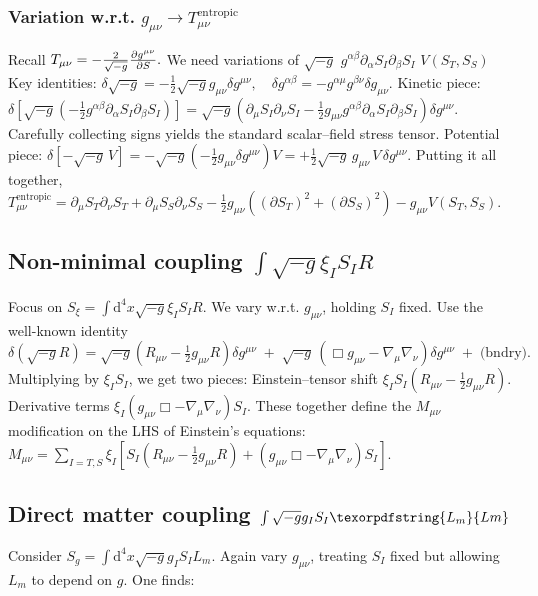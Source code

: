 \documentclass[11pt,a4paper]{article} %
\newcommand{\ST}{S_T}
\newcommand{\SSp}{S_S} %
\newcommand{\Lm}{L_m}
\newcommand{\Tmu}{T} %
\newcommand{\Mmu}{M} %
\newcommand{\Tmnentropic}{T^{\text{entropic}}_{\mu\nu}}
\begin{document}
\subsubsection{Variation w.r.t. $g_{\mu\nu}\to\Tmnentropic$}
\label{app:1.2}
Recall
$\Tmu_{\mu\nu}=-\frac{2}{\sqrt{-g}}\pdv{g^{\mu\nu}}{S}.$
We need variations of
$\sqrt{-g}$
$g^{\alpha\beta}\partial_\alpha S_I\partial_\beta S_I$
$V(\ST,\SSp)$
Key identities:
$\delta\sqrt{-g}=-\frac{1}{2}\sqrt{-g}g_{\mu\nu}\delta g^{\mu\nu},\quad \delta g^{\alpha\beta}=-g^{\alpha\mu}g^{\beta\nu}\delta g_{\mu\nu}.$
Kinetic piece:
$\delta\left[\sqrt{-g}\left(-\frac{1}{2}g^{\alpha\beta}\partial_\alpha S_I\partial_\beta S_I\right)\right]=\sqrt{-g}\left(\partial_\mu S_I\partial_\nu S_I-\frac{1}{2}g_{\mu\nu}g^{\alpha\beta}\partial_\alpha S_I\partial_\beta S_I\right)\delta g^{\mu\nu}.$
Carefully collecting signs yields the standard scalar–field stress tensor.
Potential piece:
$\delta[-\sqrt{-g}\,V] = -\sqrt{-g}\left(-\frac{1}{2}g_{\mu\nu}\delta g^{\mu\nu}\right)V = +\frac{1}{2}\sqrt{-g}\,g_{\mu\nu}\,V\,\delta g^{\mu\nu}.$
Putting it all together,
$\Tmnentropic=\partial_\mu\ST\partial_\nu\ST+\partial_\mu\SSp\partial_\nu\SSp-\frac{1}{2}g_{\mu\nu}\left((\partial\ST)^2+(\partial\SSp)^2\right)-g_{\mu\nu}V(\ST,\SSp).$

\subsection{Non-minimal coupling $\int\sqrt{-g}\xi_I S_I R$}
\label{app:2.2}
Focus on
$S_\xi=\int\text{d}^4x\sqrt{-g}\xi_I S_I R.$
We vary w.r.t. $g_{\mu\nu}$, holding $S_I$ fixed. Use the well-known identity
$\delta(\sqrt{-g}R) =\sqrt{-g}\left(R_{\mu\nu}-\frac{1}{2}g_{\mu\nu}R\right)\delta g^{\mu\nu} \;+\;\sqrt{-g}\,\left(\Box g_{\mu\nu}-\nabla_\mu\nabla_\nu\right)\delta g^{\mu\nu} \;+\;\text{(bndry)}.$
Multiplying by $\xi_I S_I$, we get two pieces:
Einstein–tensor shift
$\xi_I S_I(R_{\mu\nu}-\frac{1}{2}g_{\mu\nu}R).$
Derivative terms
$\xi_I(g_{\mu\nu}\Box-\nabla_\mu\nabla_\nu)S_I.$
These together define the $\Mmu_{\mu\nu}$ modification on the LHS of Einstein's equations:
$\Mmu_{\mu\nu}=\sum_{I=T,S}\xi_I\left[S_I(R_{\mu\nu}-\frac{1}{2}g_{\mu\nu}R)+(g_{\mu\nu}\Box-\nabla_\mu\nabla_\nu)S_I\right].$

\subsection{Direct matter coupling $\int\sqrt{-g}g_I S_I\texorpdfstring{\Lm}{Lm}$}
\label{app:2.3}
Consider
$S_g=\int\text{d}^4x\sqrt{-g}g_I S_I\Lm.$
Again vary $g_{\mu\nu}$, treating $S_I$ fixed but allowing $\Lm$ to depend on $g$. One finds:
\end{document}
